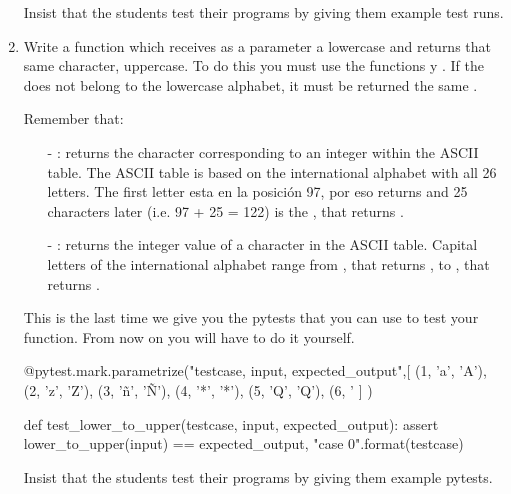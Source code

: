 \documentclass[
  fontsize=10pt,
  a4paper,
]{scrartcl}
\newenvironment{howTILEd}%
  {\begin{mdframed}[skipabove=10pt,skipbelow=10pt,backgroundcolor=pink!40]}%
  {\end{mdframed}}
\begin{document}
\begin{enumerate}
\begin{howTILEd}
Insist that the students test their programs by giving them example test runs.
\end{howTILEd}


\item Write a function  which receives as a parameter a lowercase  and returns that same character, uppercase. To do this you must use the functions  y . If the  does not belong to the lowercase alphabet, it must be returned the same .

Remember that:

\begin{itemize}
\item[-] : returns the character corresponding to an integer within the ASCII table. The ASCII table is based on the international alphabet with all 26 letters.
The first letter  esta en la posición 97, por eso  returns  and 25 characters later (i.e. 97 + 25 = 122) is the , that returns .

\item[-] : returns the integer value of a character in the ASCII table. Capital letters of the international alphabet range from
, that returns , to , that returns .
\end{itemize}


This is the last time we give you the pytests that you can use to test your function. From now on you will have to do it yourself.

\begin{python}
@pytest.mark.parametrize("testcase, input, expected_output",[
    (1, 'a', 'A'),
    (2, 'z', 'Z'),
    (3, 'ñ', 'Ñ'),
    (4, '*', '*'),
    (5, 'Q', 'Q'),
    (6, '%
    ]
)

def test_lower_to_upper(testcase, input, expected_output):
    assert lower_to_upper(input) == expected_output, "case {0}".format(testcase)
\end{python}

\begin{howTILEd}
Insist that the students test their programs by giving them example pytests.
\end{howTILEd}




\end{enumerate}
\end{document}
